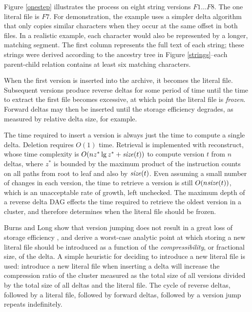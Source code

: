 \documentclass{llncs}
\begin{document}

Figure \ref{onestep} illustrates the process on eight string versions
$F1 \ldots F8$.  The one literal file is $F7$.  For demonstration, the
example uses a simpler delta algorithm that only copies similar
characters when they occur at the same offset in both files.  In a
realistic example, each character would also be represented by a
longer, matching segment.  The first column represents the full text
of each string; these strings were derived according to the ancestry
tree in Figure \ref{strings}--each parent-child relation contains at
least six matching characters.


When the first version is inserted into the archive, it becomes the
literal file.  Subsequent versions produce reverse deltas for some
period of time until the time to extract the first file becomes
excessive, at which point the literal file is \emph{frozen}.  Forward
deltas may then be inserted until the storage efficiency degrades, as
measured by relative delta size, for example.

The time required to insert a version is always just the time to
compute a single delta.  Deletion requires $O(1)$ time.  Retrieval is
implemented with reconstruct, whose time complexity is $O(n z^* \lg
z^* + \textrm{\emph{size}}(t))$ to compute version $t$ from $n$ deltas, where $z^*$
is bounded by the maximum product of the instruction counts on all
paths from root to leaf and also by $\textrm{\emph{size}}(t)$.  Even assuming a small
number of changes in each version, the time to retrieve a version is
still $O(n \textrm{\emph{size}}(t))$, which is an unacceptable rate of growth, left
unchecked.  The maximum depth of a reverse delta DAG effects the time
required to retrieve the oldest version in a cluster, and therefore
determines when the literal file should be frozen.

Burns and Long show that version jumping does not result in a great
loss of storage efficiency \cite{Burns:Backup}, and derive a
worst-case analytic point at which storing a new literal file should
be introduced as a function of the \emph{compressibility}, or
fractional size, of the delta.  A simple heuristic for deciding to
introduce a new literal file is used: introduce a new literal file
when inserting a delta will increase the compression ratio of the
cluster measured as the total size of all versions divided by the
total size of all deltas and the literal file.  The cycle of reverse
deltas, followed by a literal file, followed by forward deltas,
followed by a version jump repeats indefinitely.
\end{document}
